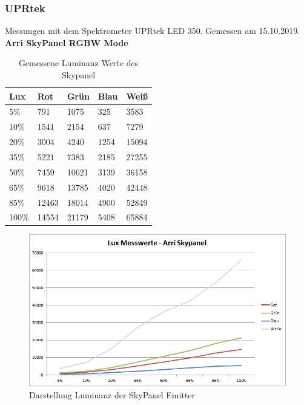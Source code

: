\documentclass[11pt]{scrartcl}
\begin{document}
\subsubsection{UPRtek}
Messungen mit dem Spektrometer UPRtek LED 350. Gemessen am 15.10.2019.\\
\textbf{Arri SkyPanel RGBW Mode}
\begin{table}[H]
    \begin{tabularx}{\textwidth}{|X|X|X|X|X|}
        \hline
        Lux   & Rot   & Grün  & Blau & Weiß \\\hline
        5\%   & 791   & 1075  & 325  & 3583 \\\hline
        10\%  & 1541  & 2154  & 637  & 7279 \\\hline
        20\%  & 3004  & 4240  & 1254 & 15094\\\hline
        35\%  & 5221  & 7383  & 2185 & 27255\\\hline
        50\%  & 7459  & 10621 & 3139 & 36158\\\hline
        65\%  & 9618  & 13785 & 4020 & 42448\\\hline
        85\%  & 12463 & 18014 & 4900 & 52849\\\hline
        100\% & 14554 & 21179 & 5408 & 65884\\\hline
    \end{tabularx}
    \caption{Gemessene Luminanz Werte des Skypanel} \label{table:luxSkypanel}
\end{table}
\noindent
\begin{figure}[H]
    \begin{center}
        \includegraphics[width=.8\textwidth]{images/charts/skypanel.png}
    \end{center}
    \caption{Darstellung Luminanz der SkyPanel Emitter} \label{fig:luxSkypanel}
\end{figure}
\end{document}

